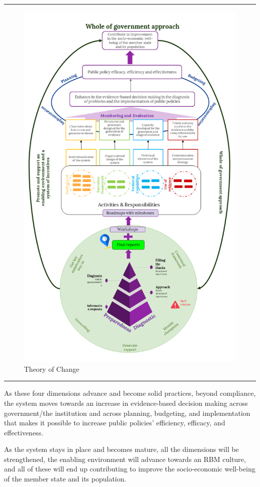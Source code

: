 \documentclass[
  10pt,
]{book}
\begin{document}
\begin{center}\rule{0.5\linewidth}{0.5pt}\end{center}

\begin{figure}

{\centering \includegraphics[width=0.75\linewidth]{./images/figure_1} 

}

\caption{Theory of Change}\label{fig:figure1}
\end{figure}

\begin{center}\rule{0.5\linewidth}{0.5pt}\end{center}

As these four dimensions advance and become solid practices, beyond compliance, the system moves towards an increase in evidence-based decision making across government/the institution and across planning, budgeting, and implementation that makes it possible to increase public policies' efficiency, efficacy, and effectiveness.

As the system stays in place and becomes mature, all the dimensions will be strengthened, the enabling environment will advance towards an RBM culture, and all of these will end up contributing to improve the socio-economic well-being of the member state and its population.
\end{document}
